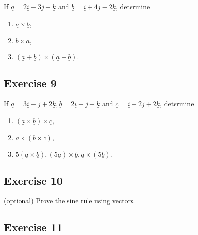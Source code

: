 \documentclass[
  11pt,
  oneside]{book}
\providecommand{\tightlist}{%
  \setlength{\itemsep}{0pt}\setlength{\parskip}{0pt}}
\newcommand{\slide}{}
\theoremstyle{definition}
\theoremstyle{definition}
\theoremstyle{definition}
\theoremstyle{definition}
\theoremstyle{remark}
\begin{document}
If \(\underline{a} = 2\underline{i} - 3\underline{j} - \underline{k}\) and \(\underline{b} = \underline{i} + 4\underline{j} - 2\underline{k}\), determine

\begin{enumerate}
\def\labelenumi{\roman{enumi}.}
\tightlist
\item
  \(\underline{a} \times \underline{b}\),
\item
  \(\underline{b} \times \underline{a}\),
\item
  \((\underline{a} + \underline{b}) \times (\underline{a} - \underline{b})\).
\end{enumerate}

\slide

\subsection*{Exercise 9}\label{exercise-9-2}

If \(\underline{a} = 3\underline{i} - \underline{j} + 2\underline{k}, \underline{b} = 2\underline{i} + \underline{j} - \underline{k}\) and \(\underline{c} = \underline{i} - 2\underline{j} + 2\underline{k}\), determine

\begin{enumerate}
\def\labelenumi{\roman{enumi}.}
\tightlist
\item
  \((\underline{a} \times \underline{b}) \times \underline{c}\),
\item
  \(\underline{a} \times (\underline{b} \times \underline{c})\),
\item
  \(5(\underline{a} \times \underline{b}), (5\underline{a})\times \underline{b}, \underline{a}\times(5\underline{b})\).
\end{enumerate}

\slide

\subsection*{Exercise 10}\label{exercise-10-1}

(optional) Prove the sine rule using vectors.

\slide

\subsection*{Exercise 11}\label{exercise-11-1}
\end{document}
